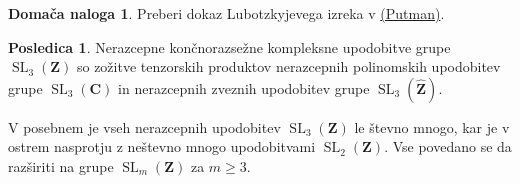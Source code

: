 \documentclass[11pt]{book}
\def\ZZ{\mathbf{Z}}
\def\CC{\mathbf{C}}
\DeclareMathOperator\SL{SL}
\theoremstyle{definition}
\theoremstyle{zgled}
\theoremstyle{odprtproblem}
\theoremstyle{domacanaloga}
\newtheorem*{domacanaloga}{Domača naloga}
\theoremstyle{izrek}
\newtheorem*{posledica}{Posledica}
\begin{document}
\begin{domacanaloga}
Preberi dokaz Lubotzkyjevega izreka v \href{https://www3.nd.edu/~andyp/notes/RepTheorySLnZ.pdf}{(Putman)}.
\end{domacanaloga}

\begin{posledica}
Nerazcepne končnorazsežne kompleksne upodobitve grupe $\SL_3(\ZZ)$ so zožitve tenzorskih produktov nerazcepnih polinomskih upodobitev grupe $\SL_3(\CC)$ in nerazcepnih zveznih upodobitev grupe $\SL_3(\widehat{\ZZ})$.
\end{posledica}

V posebnem je vseh nerazcepnih upodobitev $\SL_3(\ZZ)$ le števno mnogo, kar je v ostrem nasprotju z neštevno mnogo upodobitvami $\SL_2(\ZZ)$. Vse povedano se da razširiti na grupe $\SL_m(\ZZ)$ za $m \geq 3$.
\end{document}
